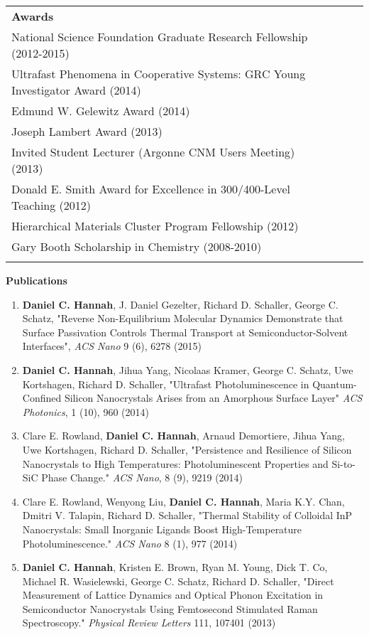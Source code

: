 \documentclass[12pt]{nuthesis}	%
\begin{document}
\begin{vita}
\begin{center}
\noindent
\begin{tabular*}{\textwidth}{l @{\extracolsep{\fill}} rrrr}
\textbf{Awards}
\\
National Science Foundation Graduate Research Fellowship (2012-2015) \\
Ultrafast Phenomena in Cooperative Systems: GRC Young Investigator Award (2014) \\
Edmund W. Gelewitz Award (2014) \\
Joseph Lambert Award (2013) \\
Invited Student Lecturer (Argonne CNM Users Meeting) (2013) \\
Donald E. Smith Award for Excellence in 300/400-Level Teaching (2012) \\
Hierarchical Materials Cluster Program Fellowship (2012) \\
Gary Booth Scholarship in Chemistry (2008-2010) \\
& & \\
\end{tabular*}
\end{center}
\noindent
\textbf{Publications}
\begin{enumerate}
\item \textbf{Daniel C. Hannah}, J. Daniel Gezelter, Richard D. Schaller, George C. Schatz, "Reverse Non-Equilibrium Molecular Dynamics Demonstrate that Surface Passivation Controls Thermal Transport at Semiconductor-Solvent Interfaces", \emph{ACS Nano} 9 (6), 6278 (2015)
\item \textbf{Daniel C. Hannah}, Jihua Yang, Nicolaas Kramer, George C. Schatz, Uwe Kortshagen, Richard D. Schaller, "Ultrafast Photoluminescence in Quantum-Confined Silicon Nanocrystals Arises from an Amorphous Surface Layer" \emph{ACS Photonics}, 1 (10), 960 (2014) 
\item Clare E. Rowland, \textbf{Daniel C. Hannah}, Arnaud Demortiere, Jihua Yang, Uwe Kortshagen, Richard D. Schaller, "Persistence and Resilience of Silicon Nanocrystals to High Temperatures:  Photoluminescent Properties and Si-to-SiC Phase Change." \emph{ACS Nano}, 8 (9), 9219 (2014) 
\item Clare E. Rowland, Wenyong Liu, \textbf{Daniel C. Hannah}, Maria K.Y. Chan, Dmitri V. Talapin, Richard D. Schaller, "Thermal Stability of Colloidal InP Nanocrystals: Small Inorganic Ligands Boost High-Temperature Photoluminescence." \emph{ACS Nano} 8 (1), 977 (2014) 
\item \textbf{Daniel C. Hannah}, Kristen E. Brown,  Ryan M. Young, Dick T. Co, Michael R. Wasielewski, George C. Schatz, Richard D. Schaller, "Direct Measurement of Lattice Dynamics and Optical Phonon Excitation in Semiconductor Nanocrystals Using Femtosecond Stimulated Raman Spectroscopy." \emph{Physical Review Letters} 111, 107401 (2013) 

\end{enumerate}
\end{vita}
\end{document}
